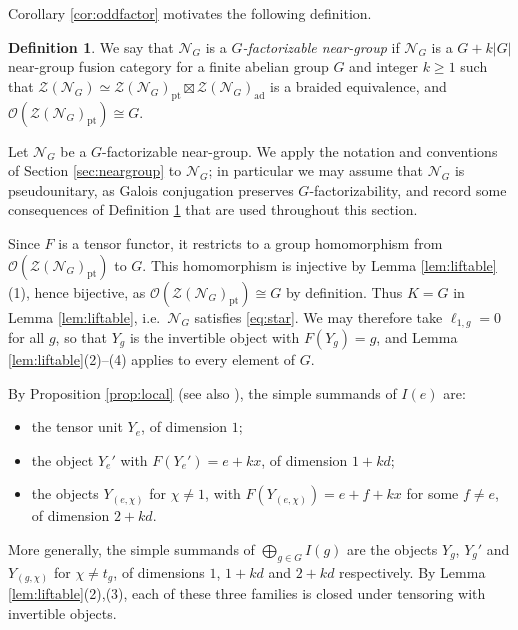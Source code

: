 \documentclass[10pt]{article}
\theoremstyle{plain}
\theoremstyle{definition}
\newtheorem{definition}[theorem]{Definition}
\theoremstyle{plain}
\begin{document}
Corollary \ref{cor:oddfactor} motivates the following definition.

\begin{definition}\label{def:factorizable}
    We say that $\mathcal{N}_G$ is a \emph{$G$-factorizable near-group} if $\mathcal{N}_G$ is a $G+k|G|$ near-group fusion category for a finite abelian group $G$ and integer $k\geq1$ such that $\mathcal{Z}(\mathcal{N}_G)\simeq\mathcal{Z}(\mathcal{N}_G)_\mathrm{pt}\boxtimes\mathcal{Z}(\mathcal{N}_G)_\mathrm{ad}$ is a braided equivalence, and $\mathcal{O}(\mathcal{Z}(\mathcal{N}_G)_\mathrm{pt})\cong G$.
\end{definition}

\par Let $\mathcal{N}_G$ be a $G$-factorizable near-group. We apply the notation and conventions of Section \ref{sec:neargroup} to $\mathcal{N}_G$; in particular we may assume that $\mathcal{N}_G$ is pseudounitary, as Galois conjugation preserves $G$-factorizability, and record some consequences of Definition \ref{def:factorizable} that are used throughout this section.

\par Since $F$ is a tensor functor, it restricts to a group homomorphism from $\mathcal{O}(\mathcal{Z}(\mathcal{N}_G)_\mathrm{pt})$ to $G$. This homomorphism is injective by Lemma \ref{lem:liftable}(1), hence bijective, as $\mathcal{O}(\mathcal{Z}(\mathcal{N}_G)_\mathrm{pt})\cong G$ by definition. Thus $K=G$ in Lemma \ref{lem:liftable}, i.e.\ $\mathcal{N}_G$ satisfies \eqref{eq:star}. We may therefore take $\ell_{1,g}=0$ for all $g$, so that $Y_g$ is the invertible object with $F(Y_g)=g$, and Lemma \ref{lem:liftable}(2)--(4) applies to every element of $G$.

\par By Proposition \ref{prop:local} (see also \cite[Theorem 2.13]{MR3427429}), the simple summands of $I(e)$ are:
\begin{itemize}
\item the tensor unit $Y_e$, of dimension $1$;
\item the object $Y_e'$ with $F(Y_e')=e+kx$, of dimension $1+kd$;
\item the objects $Y_{(e,\chi)}$ for $\chi\neq1$, with $F(Y_{(e,\chi)})=e+f+kx$ for some $f\neq e$, of dimension $2+kd$.
\end{itemize}
More generally, the simple summands of $\bigoplus_{g\in G}I(g)$ are the objects $Y_g$, $Y_g'$ and $Y_{(g,\chi)}$ for $\chi\neq t_g$, of dimensions $1$, $1+kd$ and $2+kd$ respectively. By Lemma \ref{lem:liftable}(2),(3), each of these three families is closed under tensoring with invertible objects.
\end{document}
